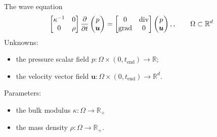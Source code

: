 \documentclass[aspectratio=169]{beamer}
\DeclareMathOperator*{\grad}{grad}
\renewcommand{\div}{\operatorname{div}}
\newcommand{\bbR}{\mathbb{R}}
\begin{document}
\begin{frame}{The wave equation}
	\begin{equation*}
		\begin{bmatrix}
			\kappa^{-1} & 0 \\
			0 & \rho
		\end{bmatrix}\diffp{}{t}\begin{pmatrix}
			p \\ \bm{u}
		\end{pmatrix} = 
		\begin{bmatrix}
			0 & \div \\
			\grad & 0 \\
		\end{bmatrix}\begin{pmatrix}
			p \\ \bm{u}
		\end{pmatrix}, , \qquad \Omega \subset \bbR^d
	\end{equation*}
Unknowns:
\begin{itemize}
\item the pressure scalar field $p : \Omega \times (0, t_{\mathrm{end}}) \rightarrow \bbR$;
\item the velocity vector field $\bm{u} : \Omega \times (0, t_{\mathrm{end}}) \rightarrow \bbR^d$.
\end{itemize}
Parameters:
\begin{itemize}
\item the bulk modulus $\kappa: \Omega \rightarrow \bbR_+$ \\
\item the mass density $\rho: \Omega \rightarrow \bbR_+$.
\end{itemize}
\end{frame}
\end{document}
